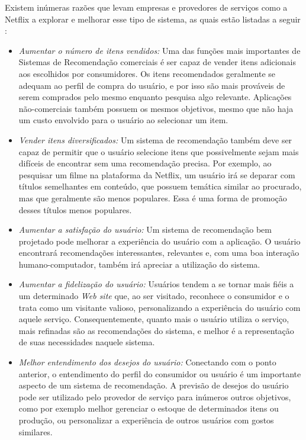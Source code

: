 \documentclass[
	12pt,				%
	oneside,			%
	a4paper,			%
	chapter=TITLE,		%
	english,			%
	french,				%
	spanish,			%
	brazil				%
	]{abntex2}
\begin{document}
Existem inúmeras razões que levam empresas e provedores de serviços como a Netflix a explorar e melhorar esse tipo de sistema, as quais estão listadas a seguir \cite{ricci2011introduction}:

\begin{itemize}
    \item \emph{Aumentar o número de itens vendidos:} Uma das funções mais importantes de Sistemas de Recomendação comerciais é ser capaz de vender itens adicionais aos escolhidos por consumidores. Os itens recomendados geralmente se adequam ao perfil de compra do usuário, e por isso são mais prováveis de serem comprados pelo mesmo enquanto pesquisa algo relevante. Aplicações não-comerciais também possuem os mesmos objetivos, mesmo que não haja um custo envolvido para o usuário ao selecionar um item.
    \item \emph{Vender itens diversificados:} Um sistema de recomendação também deve ser capaz de permitir que o usuário selecione itens que possivelmente sejam mais difíceis de encontrar sem uma recomendação precisa. Por exemplo, ao pesquisar um filme na plataforma da Netflix, um usuário irá se deparar com títulos semelhantes em conteúdo, que possuem temática similar ao procurado, mas que geralmente são menos populares. Essa é uma forma de promoção desses títulos menos populares.
    \item \emph{Aumentar a satisfação do usuário:} Um sistema de recomendação bem projetado pode melhorar a experiência do usuário com a aplicação. O usuário encontrará recomendações interessantes, relevantes e, com uma boa interação humano-computador, também irá apreciar a utilização do sistema.
    \item \emph{Aumentar a fidelização do usuário:} Usuários tendem a se tornar mais fiéis a um determinado \emph{Web site} que, ao ser visitado, reconhece o consumidor e o trata como um visitante valioso, personalizando a experiência do usuário com aquele serviço. Consequentemente, quanto mais o usuário utiliza o serviço, mais refinadas são as recomendações do sistema, e melhor é a representação de suas necessidades naquele sistema.
    \item \emph{Melhor entendimento dos desejos do usuário:} Conectando com o ponto anterior, o entendimento do perfil do consumidor ou usuário é um importante aspecto de um sistema de recomendação. A previsão de desejos do usuário pode ser utilizado pelo provedor de serviço para inúmeros outros objetivos, como por exemplo melhor gerenciar o estoque de determinados itens ou produção, ou personalizar a experiência de outros usuários com gostos similares.
\end{itemize}
\end{document}
